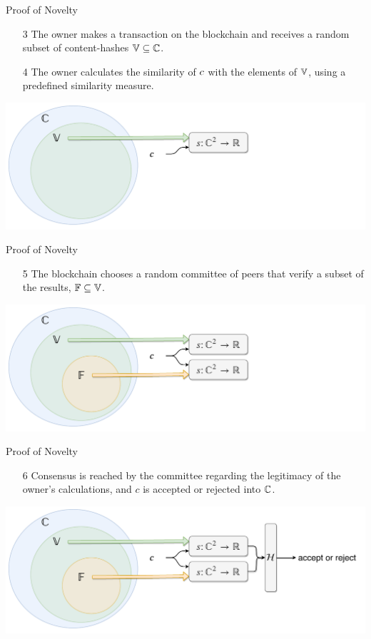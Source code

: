\documentclass{beamer}
\begin{document}
\begin{frame}{Proof of Novelty}
    \begin{enumerate}
        \item[3] The owner makes a transaction on the blockchain and receives a random subset of content-hashes ${\mathbb{V}} \subseteq {{\mathbb{C}}}$.
        \item[4] The owner calculates the similarity of ${c}$ with the elements of ${\mathbb{V}}$, using a predefined similarity measure.
    \end{enumerate}
    \vfill
    \includegraphics[width=1.0\textwidth]{assets/pon-diagram-1.pdf}
\end{frame}

\begin{frame}{Proof of Novelty}
    \begin{enumerate}
        \item[5] The blockchain chooses a random committee of peers that verify a subset of the results, ${\mathbb{F}} \subseteq {\mathbb{V}}$.
    \end{enumerate}
    \vfill
    \includegraphics[width=1.0\textwidth]{assets/pon-diagram-2.pdf}
\end{frame}

\begin{frame}{Proof of Novelty}
    \begin{enumerate}
        \item[6] Consensus is reached by the committee regarding the legitimacy of the owner's calculations, and $c$ is accepted or rejected into ${{\mathbb{C}}}$.
    \end{enumerate}
    \vfill
    \includegraphics[width=1.0\textwidth]{assets/pon-diagram-3.pdf}
\end{frame}
\end{document}
